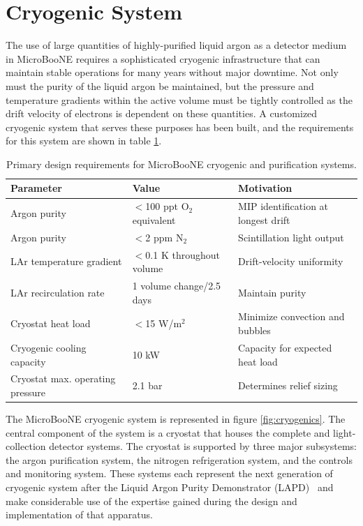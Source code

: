 \section{Cryogenic System}
\label{sec:cryostat}

The use of large quantities of highly-purified liquid argon as a detector medium in MicroBooNE requires a sophisticated cryogenic infrastructure that can maintain stable operations for many years without major downtime.  Not only must the purity of the liquid argon be maintained, but the pressure and temperature gradients within the \lartpc active volume must be tightly controlled as the drift velocity of electrons is dependent on these quantities.  A customized cryogenic system that serves these purposes has been built, and the requirements for this system are shown in table \ref{tab:cryoreq}.

\begin{table}[!htb]
   \centering
    \caption{Primary design requirements for MicroBooNE cryogenic and purification systems.} 
    \begin{tabular}{lll} %
    \hline
    Parameter & Value & Motivation\\
    \hline
      Argon purity    & $<$100 ppt O$_2$ equivalent & MIP identification at longest drift\\
      Argon purity    & $<$2 ppm N$_2$ & Scintillation light output\\
      LAr temperature gradient & $<$0.1 K throughout volume & Drift-velocity uniformity\\
      LAr recirculation rate & 1 volume change/2.5 days & Maintain purity\\
      Cryostat heat load & $<$15 W/m$^2$ & Minimize convection and bubbles\\
      Cryogenic cooling capacity & 10 kW & Capacity for expected heat load\\
      Cryostat max. operating pressure & 2.1 bar & Determines relief sizing\\
            \hline
   \end{tabular}
   \label{tab:cryoreq}
\end{table} 

The MicroBooNE cryogenic system is represented in figure \ref{fig:cryogenics}.  The central component of the system is a cryostat that houses the complete \lartpc and light-collection detector systems.  The cryostat is supported by three major subsystems: the argon purification system, the nitrogen refrigeration system, and the controls and monitoring system.  These systems each represent the next generation of \lartpc cryogenic system after the Liquid Argon Purity Demonstrator (LAPD)~\cite{Adamowski:2014-LAPD} and make considerable use of the expertise gained during the design and implementation of that apparatus.  %

